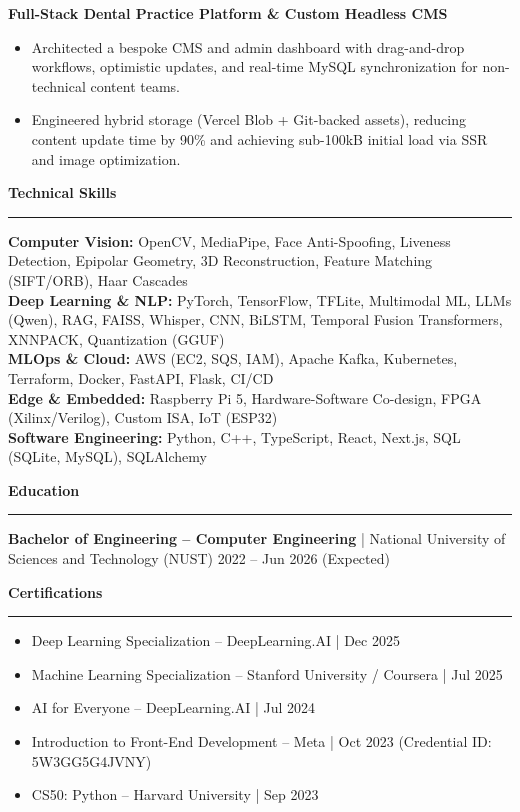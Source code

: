 \documentclass[10pt,a4paper]{article}
\newcommand{\sectiontitle}[1]{
  \vspace{5pt}\textbf{\large #1}\vspace{3pt}\\
  \hrule\vspace{5pt}
}
\begin{document}
\textbf{Full-Stack Dental Practice Platform \& Custom Headless CMS}
\begin{itemize}
  \item Architected a bespoke CMS and admin dashboard with drag-and-drop workflows, optimistic updates, and real-time MySQL synchronization for non-technical content teams.
  \item Engineered hybrid storage (Vercel Blob + Git-backed assets), reducing content update time by 90\% and achieving sub-100kB initial load via SSR and image optimization.
\end{itemize}

\sectiontitle{Technical Skills}
\textbf{Computer Vision:} OpenCV, MediaPipe, Face Anti-Spoofing, Liveness Detection, Epipolar Geometry, 3D Reconstruction, Feature Matching (SIFT/ORB), Haar Cascades\\
\textbf{Deep Learning \& NLP:} PyTorch, TensorFlow, TFLite, Multimodal ML, LLMs (Qwen), RAG, FAISS, Whisper, CNN, BiLSTM, Temporal Fusion Transformers, XNNPACK, Quantization (GGUF)\\
\textbf{MLOps \& Cloud:} AWS (EC2, SQS, IAM), Apache Kafka, Kubernetes, Terraform, Docker, FastAPI, Flask, CI/CD\\
\textbf{Edge \& Embedded:} Raspberry Pi 5, Hardware-Software Co-design, FPGA (Xilinx/Verilog), Custom ISA, IoT (ESP32)\\
\textbf{Software Engineering:} Python, C++, TypeScript, React, Next.js, SQL (SQLite, MySQL), SQLAlchemy

\sectiontitle{Education}
\textbf{Bachelor of Engineering -- Computer Engineering} | National University of Sciences and Technology (NUST) \hfill 2022 -- Jun 2026 (Expected)

\sectiontitle{Certifications}
\begin{itemize}
  \item Deep Learning Specialization -- DeepLearning.AI | Dec 2025
  \item Machine Learning Specialization -- Stanford University / Coursera | Jul 2025
  \item AI for Everyone -- DeepLearning.AI | Jul 2024
  \item Introduction to Front-End Development -- Meta | Oct 2023 (Credential ID: 5W3GG5G4JVNY)
  \item CS50: Python -- Harvard University | Sep 2023
\end{itemize}
\end{document}
